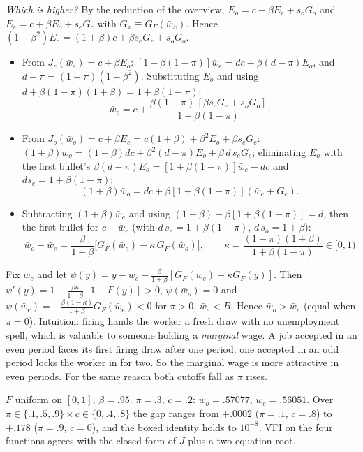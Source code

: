 \documentclass[12pt, letterpaper]{article}
\newcommand{\wb}{\bar w}
\begin{document}
\begin{tcolorbox}[evenbox,title={Exercise 6.16 \quad Seasons, II}]
\emph{Which is higher?} By the reduction of the overview, $E_o=c+\beta E_e+s_oG_o$ and $E_e=c+\beta E_o+s_eG_e$
with $G_x\equiv G_F(\wb_x)$. Hence $(1-\beta^2)E_o=(1+\beta)c+\beta s_eG_e+s_oG_o$.
\begin{itemize}[itemsep=2pt]
\item From $J_e(\wb_e)=c+\beta E_o$: $[1+\beta(1-\pi)]\wb_e=dc+\beta(d-\pi)E_o$, and $d-\pi=(1-\pi)(1-\beta^2)$. Substituting
$E_o$ and using $d+\beta(1-\pi)(1+\beta)=1+\beta(1-\pi)$:
\[
\wb_e=c+\frac{\beta(1-\pi)\,[\beta s_eG_e+s_oG_o]}{1+\beta(1-\pi)} .
\]
\item From $J_o(\wb_o)=c+\beta E_e=c(1+\beta)+\beta^2E_o+\beta s_eG_e$:
$(1+\beta)\wb_o=(1+\beta)dc+\beta^2(d-\pi)E_o+\beta\,d\,s_eG_e$; eliminating $E_o$ with the first bullet's
$\beta(d-\pi)E_o=[1+\beta(1-\pi)]\wb_e-dc$ and $ds_e=1+\beta(1-\pi)$:
\[
(1+\beta)\wb_o=dc+\beta[1+\beta(1-\pi)](\wb_e+G_e).
\]
\item Subtracting $(1+\beta)\wb_e$ and using $(1+\beta)-\beta[1+\beta(1-\pi)]=d$, then the first bullet for $c-\wb_e$
(with $d\,s_e=1+\beta(1-\pi)$, $d\,s_o=1+\beta$):
\[
\boxed{\wb_o-\wb_e=\frac{\beta}{1+\beta}\big[G_F(\wb_e)-\kappa\,G_F(\wb_o)\big],\qquad \kappa=\frac{(1-\pi)(1+\beta)}{1+\beta(1-\pi)}\in[0,1)}
\]
\end{itemize}
Fix $\wb_e$ and let $\psi(y)=y-\wb_e-\frac{\beta}{1+\beta}[G_F(\wb_e)-\kappa G_F(y)]$. Then
$\psi'(y)=1-\frac{\beta\kappa}{1+\beta}[1-F(y)]>0$, $\psi(\wb_o)=0$ and $\psi(\wb_e)=-\frac{\beta(1-\kappa)}{1+\beta}G_F(\wb_e)<0$ for
$\pi>0$, $\wb_e<B$. Hence $\boxed{\wb_o>\wb_e}$ (equal when $\pi=0$). Intuition: firing hands the worker a fresh
draw with no unemployment spell, which is valuable to someone holding a \emph{marginal} wage. A job
accepted in an even period faces its first firing draw after one period; one accepted in an odd period
locks the worker in for two. So the marginal wage is more attractive in even periods. For the same reason
both cutoffs fall as $\pi$ rises.

\begin{tcolorbox}[databox]
$F$ uniform on $[0,1]$, $\beta=.95$. $\pi=.3$, $c=.2$: $\wb_o=.57077$, $\wb_e=.56051$. Over
$\pi\in\{.1,.5,.9\}\times c\in\{0,.4,.8\}$ the gap ranges from $+.0002$ ($\pi=.1$, $c=.8$) to $+.178$ ($\pi=.9$, $c=0$),
and the boxed identity holds to $10^{-8}$. VFI on the four functions agrees with the closed form of $J$ plus a
two-equation root.
\end{tcolorbox}
\end{tcolorbox}
\end{document}
